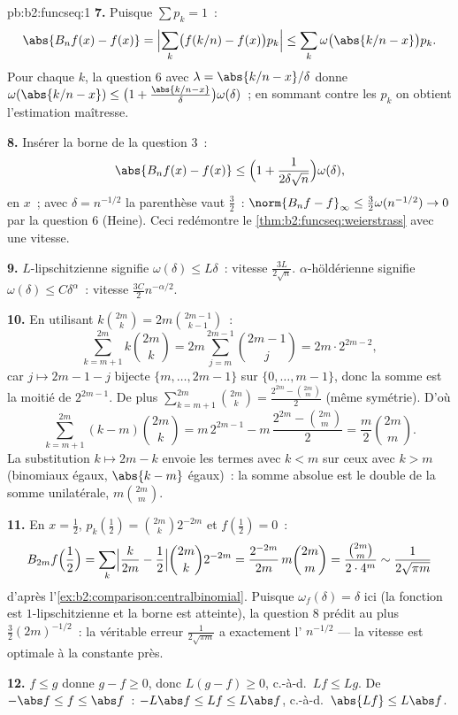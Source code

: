 \begin{solution}{pb:b2:funcseq:1}
\textbf{7.} Puisque $\sum p_k = 1$~:
\[
\abs{B_nf(x) - f(x)}
= \Bigl|\sum_k\bigl(f(k/n) - f(x)\bigr)p_k\Bigr|
\leq \sum_k\omega\bigl(\abs{k/n - x}\bigr)p_k .
\]
Pour chaque $k$, la question 6 avec $\lambda = \abs{k/n - x}/\delta$
donne $\omega(\abs{k/n-x}) \leq \bigl(1 +
\frac{\abs{k/n-x}}\delta\bigr)\omega(\delta)$~; en sommant contre
les $p_k$ on obtient l'estimation maîtresse.

\textbf{8.} Insérer la borne de la question 3~:
\[
\abs{B_nf(x) - f(x)} \leq \Bigl(1 +
\frac{1}{2\delta\sqrt n}\Bigr)\omega(\delta),
\]
 en $x$~; avec $\delta = n^{-1/2}$ la parenthèse vaut
$\frac32$~: $\norm{B_nf - f}_\infty \leq
\frac32\omega(n^{-1/2}) \to 0$ par la question 6 (Heine). Ceci
redémontre le \cref{thm:b2:funcseq:weierstrass} avec une vitesse.

\textbf{9.} $L$-lipschitzienne signifie $\omega(\delta) \leq L\delta$~:
vitesse $\frac{3L}{2\sqrt n}$. $\alpha$-höldérienne signifie
$\omega(\delta) \leq C\delta^\alpha$~: vitesse $\frac{3C}{2}
n^{-\alpha/2}$.

\textbf{10.} En utilisant $k\binom{2m}k = 2m\binom{2m-1}{k-1}$~:
\[
\sum_{k=m+1}^{2m}k\binom{2m}k
= 2m\sum_{j=m}^{2m-1}\binom{2m-1}{j}
= 2m\cdot 2^{2m-2},
\]
car $j \mapsto 2m-1-j$ bijecte $\{m,\dots,2m-1\}$ sur
$\{0,\dots,m-1\}$, donc la somme est la moitié de $2^{2m-1}$. De plus
$\sum_{k=m+1}^{2m}\binom{2m}k = \frac{2^{2m} -
\binom{2m}m}{2}$ (même symétrie). D'où
\[
\sum_{k=m+1}^{2m}(k-m)\binom{2m}k
= m\,2^{2m-1} - m\,\frac{2^{2m} - \binom{2m}m}{2}
= \frac m2\binom{2m}m .
\]
La substitution $k \mapsto 2m-k$ envoie les termes avec $k < m$
sur ceux avec $k > m$ (binomiaux égaux, $\abs{k-m}$ égaux)~:
la somme absolue est le double de la somme unilatérale, $m\binom{2m}m$.

\textbf{11.} En $x = \frac12$, $p_k(\tfrac12) =
\binom{2m}k2^{-2m}$ et $f(\tfrac12) = 0$~:
\[
B_{2m}f\Bigl(\frac12\Bigr)
= \sum_k\Bigl|\frac{k}{2m} - \frac12\Bigr|
\binom{2m}k 2^{-2m}
= \frac{2^{-2m}}{2m}\,m\binom{2m}m
= \frac{\binom{2m}m}{2\cdot4^m}
\sim \frac{1}{2\sqrt{\pi m}}
\]
d'après l'\cref{ex:b2:comparison:centralbinomial}. Puisque $\omega_f
(\delta) = \delta$ ici (la fonction est $1$-lipschitzienne et la
borne est atteinte), la question 8 prédit au plus
$\frac32(2m)^{-1/2}$~: la véritable erreur $\frac{1}{2\sqrt{\pi m}}$
a exactement l' $n^{-1/2}$ --- la vitesse est optimale à la
constante près.

\textbf{12.} $f \leq g$ donne $g - f \geq 0$, donc $L(g-f) \geq
0$, c.-à-d.\ $Lf \leq Lg$. De $-\abs f \leq f \leq \abs f$~:
$-L\abs f \leq Lf \leq L\abs f$, c.-à-d.\ $\abs{Lf} \leq
L\abs f$.


\end{solution}
